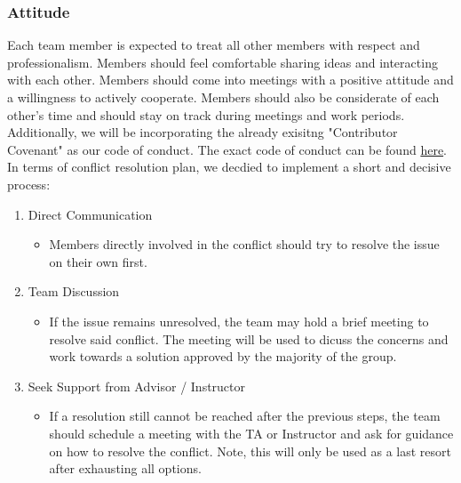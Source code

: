 \documentclass{article}
\begin{document}
\subsubsection*{Attitude}


Each team member is expected to treat all other members with respect and 
professionalism. Members should feel comfortable sharing ideas and 
interacting with each other. Members should come into meetings with a
 positive attitude and a willingness to actively cooperate. 
 Members should also be considerate of each other’s time and 
 should stay on track during meetings and work periods.\\

Additionally, we will be incorporating the already exisitng 
"Contributor Covenant" as our code of conduct. 
The exact code of conduct can be found 
\href{https://www.contributor-covenant.org/version/2/1/code_of_conduct/}
{here}. \\

In terms of conflict resolution plan, we decdied to implement a short and decisive process: \\
\begin{enumerate}
  \item Direct Communication
  \begin{itemize}
    \item Members directly involved in the conflict should 
    try to resolve the issue on their own first. 
  \end{itemize}
  \item Team Discussion
  \begin{itemize}
    \item If the issue remains unresolved, the team may hold a brief
    meeting to resolve said conflict. The meeting will be used to dicuss
    the concerns and work towards a solution 
    approved by the majority of the group.
  \end{itemize}
  \item Seek Support from Advisor / Instructor
  \begin{itemize}
    \item If a resolution still cannot be reached after the previous steps,
    the team should schedule a meeting with the TA or Instructor and ask for 
    guidance on how to resolve the conflict. Note, this will only be used as
    a last resort after exhausting all options.
  \end{itemize}
\end{enumerate}
\end{document}
